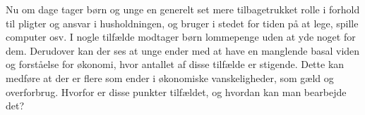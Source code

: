 Nu om dage tager børn og unge en generelt set mere tilbagetrukket rolle i forhold til pligter og ansvar i husholdningen, og bruger i stedet for tiden på at lege, spille computer osv. I nogle tilfælde modtager børn lommepenge uden at yde noget for dem\cite{Boerneliv}. Derudover kan der ses at unge ender med at have en manglende basal viden og forståelse for økonomi, hvor antallet af disse tilfælde er stigende\cite{BusinessDK2}. Dette kan medføre at der er flere som ender i økonomiske vanskeligheder, som gæld og overforbrug. Hvorfor er disse punkter tilfældet, og hvordan kan man bearbejde det?
